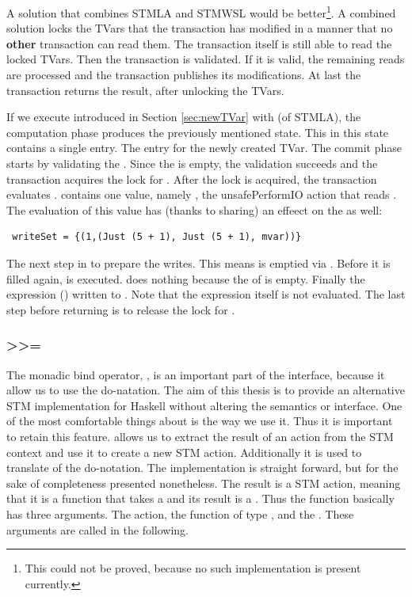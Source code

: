 A solution that combines STMLA and STMWSL would be better\footnote{This could 
not be proved, because no such implementation is present currently.}.
A combined solution locks the TVars that the transaction has modified in a 
manner that no \textbf{other} transaction can read them. The transaction itself
is still able to read the locked TVars. Then the transaction is validated. 
If it is valid, the remaining reads are processed and the transaction publishes
its modifications. At last the transaction returns the result, after unlocking
the TVars.

If we execute  introduced in Section \ref{sec:newTVar} with 
 (of STMLA), the computation phase produces the previously mentioned state.
This  in this state contains a single entry. The entry for the
newly created TVar. The commit phase starts by validating the . 
Since the  is empty, the validation succeeds and the transaction
acquires the lock for . After the lock is acquired, the transaction 
evaluates .  contains one value, namely ,
the {unsafePerformIO} action that reads . The evaluation of this value 
has (thanks to sharing) an effeect on the  as well:
\begin{lstlisting}
 writeSet = {(1,(Just (5 + 1), Just (5 + 1), mvar))} 
\end{lstlisting}
The next step in to prepare the writes. This means  is emptied via 
. Before it is filled again,  is executed. 
does nothing because the  of  is empty. Finally the expression ()
written to . Note that the expression itself is not evaluated. The last step
before returning \code{()} is to release the lock for .

\subsubsection{>>=}
The monadic bind operator, \code{>>=}, is an important part of the interface, because it allow us 
to use the do-natation. The aim of this thesis is to provide an alternative STM 
implementation for Haskell without altering the semantics or interface. One of 
the most comfortable things about is the way we use it. Thus it is important to 
retain this feature.  allows us to 
extract the result of an  action from the STM context and use it to create 
a new STM action. Additionally it is used to translate \code{<-} of the do-notation.
The implementation is straight forward, but for the sake of completeness presented
nonetheless. The result is a STM action, meaning that it is a function that takes 
a  and its result is a . Thus the function basically
has three arguments. The  action, the function of type ,
and the . These arguments are called 
in the following. 

